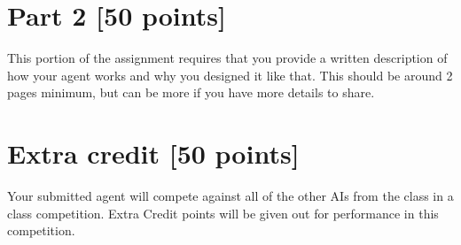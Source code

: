 \documentclass[10pt,a4paper]{article}
\begin{document}
\section*{Part 2 [50 points]} 
This portion of the assignment requires that you provide a written description of how your agent works and why you designed it like that. This should be around 2 pages minimum, but can be more if you have more details to share. 

\section{Extra credit [50 points]}
Your submitted agent will compete against all of the other AIs from the class in a class competition.  Extra Credit points will be given out for performance in this competition. 
\end{document}
